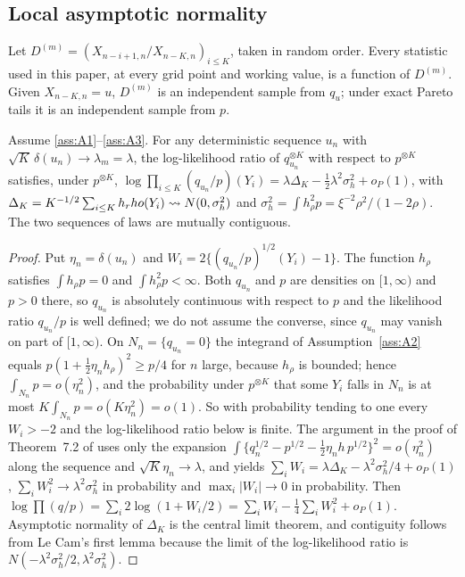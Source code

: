\subsection{Local asymptotic normality}

Let $D^{(m)}=(X_{n-i+1,n}/X_{n-K,n})_{i\le K}$, taken in random order. Every statistic used in
this paper, at every grid point and working value, is a function of $D^{(m)}$. Given
$X_{n-K,n}=u$, $D^{(m)}$ is an independent sample from $q_u$; under exact Pareto tails it is an
independent sample from $p$.

\begin{lemma}\label{lem:lan}
Assume \ref{ass:A1}--\ref{ass:A3}. For any deterministic sequence $u_n$ with
$\sqrt{K}\,\delta(u_n)\to\lambda_m=\lambda$, the log-likelihood ratio of $q_{u_n}^{\otimes K}$
with respect to $p^{\otimes K}$ satisfies, under $p^{\otimes K}$,
$\log\prod_{i\le K}(q_{u_n}/p)(Y_i)=\lambda\Delta_K-\tfrac12\lambda^2\sigma_h^2+o_P(1)$, with
$\Delta_K=K^{-1/2}\sum_{i\le K}h_rho(Y_i)\rightsquigarrow N(0,\sigma_h^2)$ and $\sigma_h^2=\int h_\rho^2p=\xi^{-2}\rho^2/(1-2\rho)$. The two
sequences of laws are mutually contiguous.
\end{lemma}

\begin{proof}
Put $\eta_n=\delta(u_n)$ and $W_{i}=2\{(q_{u_n}/p)^{1/2}(Y_i)-1\}$. The function $h_\rho$ satisfies $\int h_\rho p=0$ and $\int h_\rho^2p<\infty$. Both $q_{u_n}$ and $p$ are densities on $[1,\infty)$ and $p>0$ there, so $q_{u_n}$ is absolutely continuous with respect to $p$ and the likelihood ratio $q_{u_n}/p$ is well defined; we do not assume the converse, since $q_{u_n}$ may vanish on part of $[1,\infty)$. On $N_n=\{q_{u_n}=0\}$ the integrand of Assumption~\ref{ass:A2} equals $p(1+\frac12\eta_nh_\rho)^2\ge p/4$ for $n$ large, because $h_\rho$ is bounded; hence $\int_{N_n}p=o(\eta_n^2)$, and the probability under $p^{\otimes K}$ that some $Y_i$ falls in $N_n$ is at most $K\int_{N_n}p=o(K\eta_n^2)=o(1)$. So with probability tending to one every $W_i>-2$ and the log-likelihood ratio below is finite. The argument in the proof of Theorem~7.2 of \citet{vandervaart1998} uses only the expansion
$\int\{q_n^{1/2}-p^{1/2}-\frac12\eta_nh\,p^{1/2}\}^2=o(\eta_n^2)$ along the sequence and
$\sqrt{K}\eta_n\to\lambda$, and yields $\sum_iW_i=\lambda\Delta_K-\lambda^2\sigma_h^2/4+o_P(1)$,
$\sum_iW_i^2\to\lambda^2\sigma_h^2$ in probability and $\max_i|W_i|\to0$ in probability. Then
$\log\prod(q/p)=\sum_i2\log(1+W_i/2)=\sum_iW_i-\frac14\sum_iW_i^2+o_P(1)$. Asymptotic
normality of $\Delta_K$ is the central limit theorem, and contiguity follows from Le Cam's first
lemma because the limit of the log-likelihood ratio is $N(-\lambda^2\sigma_h^2/2,\lambda^2\sigma_h^2)$.
\qedhere
\end{proof}

